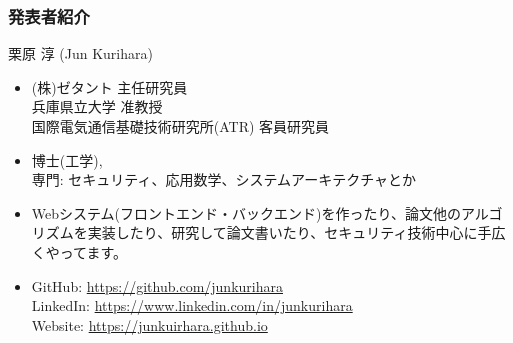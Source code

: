 \begin{frame}
\frametitle{発表者紹介}
\small
{\Large 栗原 淳 (Jun Kurihara)}
\begin{itemize}
 \item (株)ゼタント 主任研究員\\
兵庫県立大学 准教授\\
国際電気通信基礎技術研究所(ATR) 客員研究員\\
 \item 博士(工学), \\
 専門: セキュリティ、応用数学、システムアーキテクチャとか
 \item  Webシステム(フロントエンド・バックエンド)を作ったり、論文他のアルゴリズムを実装したり、研究して論文書いたり、セキュリティ技術中心に手広くやってます。
 \item GitHub: \url{https://github.com/junkurihara}\\
LinkedIn: \url{https://www.linkedin.com/in/junkurihara}\\
Website: \url{https://junkuirhara.github.io}
\end{itemize}
\end{frame}
